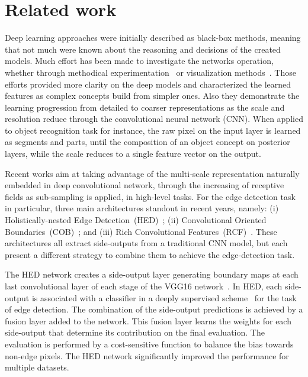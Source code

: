 \section{Related work}
\label{sec:related}

Deep learning approaches were initially described as black-box methods, meaning that not much were known about the reasoning and decisions of the created models. Much effort has been made to investigate the networks operation, whether through methodical experimentation~\cite{ilin17,kuo16,eigen14,zhang17} or visualization methods~\cite{simonyan13,zeiler14}. Those efforts provided more clarity on the deep models and characterized the learned features as complex concepts build from simpler ones. Also they demonstrate the learning progression from detailed to coarser representations as the scale and resolution reduce through the convolutional neural network (CNN).  When applied to object recognition task for instance, the raw pixel on the input layer is learned as segments and parts, until the composition of an object concept on posterior layers, while the scale reduces to a single feature vector on the output.  

Recent works aim at taking advantage of the multi-scale representation naturally embedded in deep convolutional network, through the increasing of receptive fields as sub-sampling is applied, in high-level tasks. For the edge detection task in particular, three main architectures standout in recent years, namely: (i) Holistically-nested Edge Detection~(HED)~\cite{xie2015,xie2017}; (ii) Convolutional Oriented Boundaries~(COB)~\cite{maninis2017}; and (iii) Rich Convolutional Features~(RCF)~\cite{liu2017}. These architectures all extract side-outputs from a traditional CNN model, but each present a different strategy to combine them to achieve the edge-detection task.

The HED network creates a side-output layer generating boundary maps at each last convolutional layer of each stage of the VGG16 network~\cite{simonyan2014}. In HED, each side-output is associated with a classifier in a deeply supervised scheme~\cite{lee2015} for the task of edge detection. The combination of the side-output predictions is achieved by a fusion layer added to the network. This fusion layer learns the weights for each side-output that determine its contribution on the final evaluation.
The evaluation is performed by a cost-sensitive function to balance the bias towards non-edge pixels. The HED network significantly improved the performance for multiple datasets.

